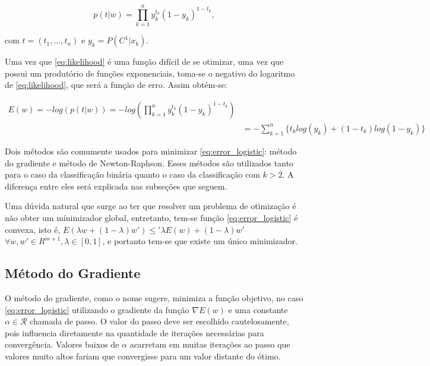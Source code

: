 \begin{center}
	\begin{equation}
		\label{eq:likelihood}
		p(t | w) = \prod_{k = 1}^n y_k^{t_k}(1 - y_k)^{1 - t_k}	,
	\end{equation}
\end{center}

com $t = (t_1, \ldots, t_n)$ e $y_k = P(C^1 | x_k)$.

Uma vez que \ref{eq:likelihood} é uma função difícil de se otimizar, uma vez que possui um
produtório de funções exponenciais, toma-se o negativo do logaritmo de \ref{eq:likelihood},
que será a função de erro. Assim obtém-se:

\begin{center}
	\begin{equation}
		\begin{split}
			\label{eq:error_logistic}
			E(w) = - log(p(t | w)) = -log(\prod_{k = 1}^n y_k^{t_k}(1 - y_k)^{1 - t_k}	) \\
		 	& = - \sum_{k = 1}^{n} \{t_k log(y_k) + (1 - t_k) log(1 - y_k)\} 
		\end{split}
	\end{equation}
\end{center}

Dois métodos são comumente usados para minimizar \ref{eq:error_logistic}: 
método do gradiente e método de Newton-Raphson. Esses métodos são utilizados tanto para o caso da classificação binária quanto o caso da classificação com $k > 2$. A diferença entre eles será explicada
nas subseções que seguem.

Uma dúvida natural que surge ao ter que resolver um problema de otimização é não
obter um mínimizador global, entretanto, tem-se
função \ref{eq:error_logistic} é convexa, isto é, $E(\lambda w + (1 - \lambda ) w') \leq' \lambda E(w) 
	+ (1 - \lambda ) w'$
 $\forall w, w' \in R^{m + 1}, \lambda \in [0, 1]$, e portanto tem-se que existe um único minimizador.


\subsection{Método do Gradiente}\label{subsec:grad_descent}

O método do gradiente, como o nome sugere, minimiza a função objetivo, no caso \ref{eq:error_logistic}
utilizando o gradiente da função $\nabla E(w)$ e uma constante $\alpha \in \mathcal{R}$ chamada de
passo. O valor do passo deve ser escolhido cautelosamente, pois influencia diretamente na quantidade
de iterações necessárias para convergência. Valores baixos de $\alpha$ acarretam em muitas iterações
ao passo que valores muito altos fariam que convergisse para um valor distante do ótimo. 

